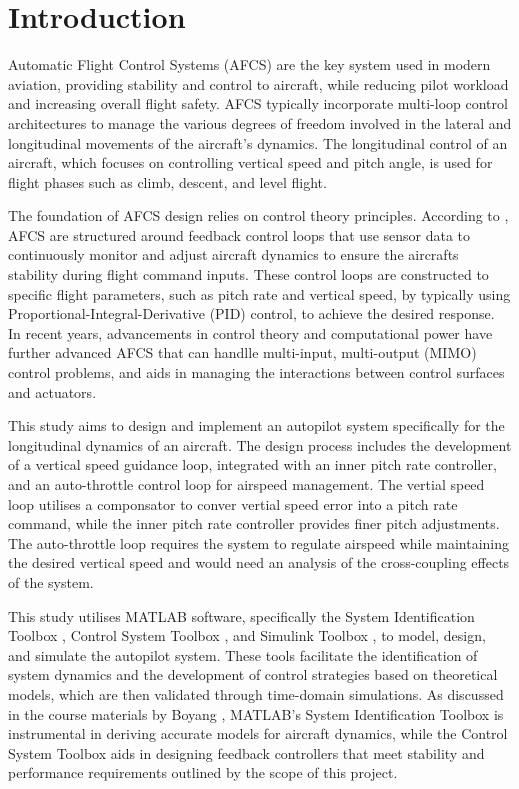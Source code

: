 \documentclass{UoNMCHA}
\numberwithin{equation}{section}
\begin{document}
 
\newpage
\tableofcontents
\newpage
\section{Introduction}
Automatic Flight Control Systems (AFCS) are the key system used in modern aviation, providing stability and control to aircraft, while 
reducing pilot workload and increasing overall flight safety. AFCS typically incorporate multi-loop control architectures to manage the various 
degrees of freedom involved in the lateral and longitudinal movements of the aircraft's dynamics. The longitudinal control of an aircraft, which 
focuses on controlling vertical speed and pitch angle, is used for flight phases such as climb, descent, and level flight.

The foundation of AFCS design relies on control theory principles. According to \cite{stevens2016aircraft}, AFCS are structured around feedback 
control loops that use sensor data to continuously monitor and adjust aircraft dynamics to ensure the aircrafts stability during flight command 
inputs. These control loops are constructed to specific flight parameters, such as pitch rate and vertical speed, by typically using 
Proportional-Integral-Derivative (PID) control, to achieve the desired response. In recent years, advancements in control theory and computational 
power have further advanced AFCS that can handlle multi-input, multi-output (MIMO) control problems, and aids in managing the interactions between 
control surfaces and actuators. 

This study aims to design and implement an autopilot system specifically for the longitudinal dynamics of an aircraft. The design process includes 
the development of a vertical speed guidance loop, integrated with an inner pitch rate controller, and an auto-throttle control loop for airspeed 
management. The vertial speed loop utilises a componsator to conver vertial speed error into a pitch rate command, while the inner pitch rate 
controller provides finer pitch adjustments. The auto-throttle loop requires the system to regulate airspeed while maintaining the desired vertical 
speed and would need an analysis of the cross-coupling effects of the system.

This study utilises MATLAB software, specifically the System Identification Toolbox \cite{MATLAB-SYS-ID}, Control System Toolbox 
\cite{MATLAB-CONTROL}, and Simulink Toolbox \cite{MATLAB-SIMULINK}, to model, design, and simulate the autopilot system. These tools facilitate the 
identification of system dynamics and the development of control strategies based on theoretical models, which are then validated through time-domain 
simulations. As discussed in the course materials by Boyang \citet{lectures}, MATLAB’s System Identification Toolbox is instrumental in deriving 
accurate models for aircraft dynamics, while the Control System Toolbox aids in designing feedback controllers that meet stability and performance 
requirements outlined by the scope of this project. 
\end{document}
